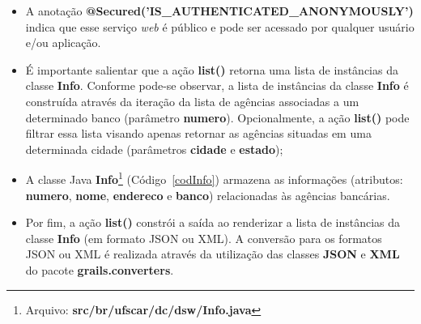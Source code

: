 \begin{itemize}

\vspace{0.5cm}

\item  A anotação  {\bf  @Secured('IS\_AUTHENTICATED\_ANONYMOUSLY')} indica  que
  esse serviço {\it web} é público e pode ser acessado por qualquer usuário e/ou
  aplicação.  

\vspace{0.5cm} 

\item  É importante  salientar que  a  ação {\bf  list()} retorna  uma lista  de
  instâncias  da classe  {\bf  Info}.   Conforme pode-se  observar,  a lista  de
  instâncias da classe  {\bf Info} é construída através da  iteração da lista de
  agências    associadas    a    um    determinado   banco    (parâmetro    {\bf
    numero}).   Opcionalmente,  a ação  {\bf  list()}  pode  filtrar essa  lista
  visando  apenas  retornar  as  agências  situadas em  uma  determinada  cidade
  (parâmetros {\bf cidade} e {\bf estado}); 

\vspace{0.5cm}

\item      A     classe      Java     {\bf      Info}\footnote{Arquivo:     {\bf
    src/br/ufscar/dc/dsw/Info.java}}    (Código~\ref{codInfo})    armazena    as
  informações  (atributos:  {\bf numero},  {\bf  nome},  {\bf  endereco} e  {\bf
    banco}) relacionadas às agências bancárias.  

\vspace{0.5cm}

\item Por  fim, a ação {\bf  list()} constrói a  saída ao renderizar a  lista de
  instâncias da classe {\bf Info} (em formato JSON ou XML).  A conversão para os
  formatos JSON ou XML é realizada  através da utilização das classes {\bf JSON}
  e {\bf XML} do pacote {\bf grails.converters}. 

\end{itemize}

